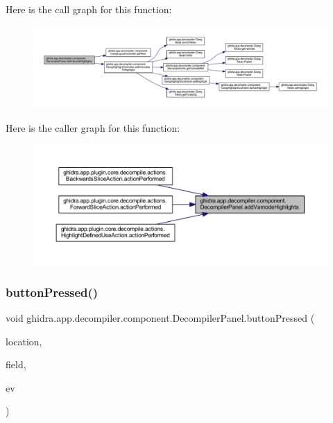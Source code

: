 Here is the call graph for this function\+:
\nopagebreak
\begin{figure}[H]
\begin{center}
\leavevmode
\includegraphics[width=350pt]{classghidra_1_1app_1_1decompiler_1_1component_1_1_decompiler_panel_a95b083e3ec26f9c72f78240bfc26f946_cgraph}
\end{center}
\end{figure}
Here is the caller graph for this function\+:
\nopagebreak
\begin{figure}[H]
\begin{center}
\leavevmode
\includegraphics[width=350pt]{classghidra_1_1app_1_1decompiler_1_1component_1_1_decompiler_panel_a95b083e3ec26f9c72f78240bfc26f946_icgraph}
\end{center}
\end{figure}
\mbox{\label{classghidra_1_1app_1_1decompiler_1_1component_1_1_decompiler_panel_a6e2548f82106d402f3e618830ae78d1d}} 
\subsubsection{\texorpdfstring{buttonPressed()}{buttonPressed()}}
{\footnotesize\ttfamily void ghidra.\+app.\+decompiler.\+component.\+Decompiler\+Panel.\+button\+Pressed (\begin{DoxyParamCaption}\item[{Field\+Location}]{location,  }\item[{Field}]{field,  }\item[{Mouse\+Event}]{ev }\end{DoxyParamCaption})\hspace{0.3cm}{\ttfamily [inline]}}



